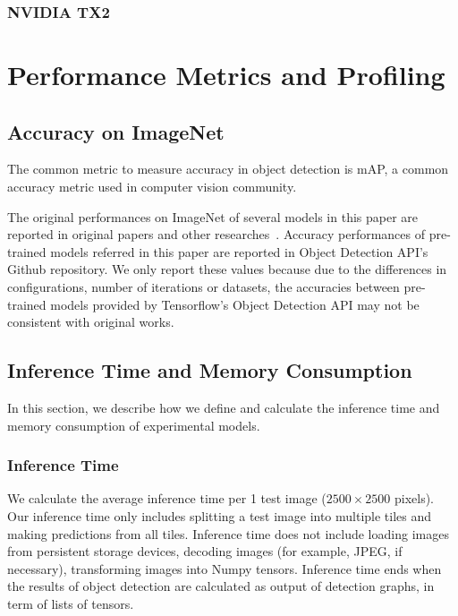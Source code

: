 \documentclass[conference]{IEEEtran}
\begin{document}
\subsubsection{NVIDIA TX2}

\section{Performance Metrics and Profiling}

\subsection{Accuracy on ImageNet}
The common metric to measure accuracy in object detection is mAP, a common accuracy metric used in computer vision community.

The original performances on ImageNet of several models in this paper are reported in original papers and other researches~\cite{huang2017speed}. Accuracy performances of pre-trained models referred in this paper are reported in Object Detection API's Github repository. We only report these values because due to the differences in configurations, number of iterations or datasets, the accuracies between pre-trained models provided by Tensorflow's Object Detection API may not be consistent with original works.

\subsection{Inference Time and Memory Consumption}
In this section, we describe how we define and calculate the inference time and memory consumption of experimental models.

\subsubsection{Inference Time}
We calculate the average inference time per 1 test image ($2500 \times 2500$ pixels). Our inference time only includes splitting a test image into multiple tiles and making predictions from all tiles. Inference time does not include loading images from persistent storage devices, decoding images (for example, JPEG, if necessary), transforming images into Numpy tensors. Inference time ends when the results of object detection are calculated as output of detection graphs, in term of lists of tensors.
\end{document}
